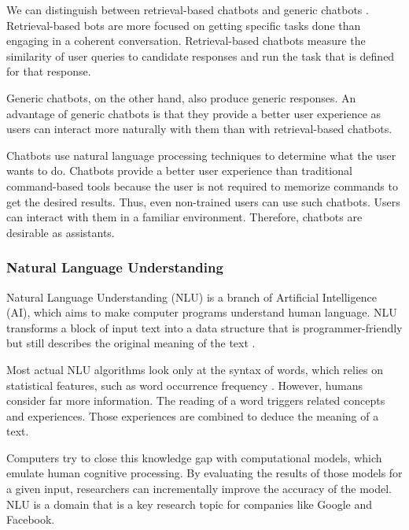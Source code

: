 
We can distinguish between retrieval-based chatbots and generic chatbots \cite{NLKl19,WWX*16}.
Retrieval-based bots are more focused on getting specific tasks done than engaging in a coherent conversation.
Retrieval-based chatbots measure the similarity of user queries to candidate responses and run the task that is defined for that response.

Generic chatbots, on the other hand, also produce generic responses.
An advantage of generic chatbots is that they provide a better user experience as users can interact more naturally with them than with retrieval-based chatbots.

Chatbots use natural language processing techniques to determine what the user wants to do.
Chatbots provide a better user experience \cite{CHW*17} than traditional command-based tools because the user is not required to memorize commands to get the desired results.
Thus, even non-trained users can use such chatbots.
Users can interact with them in a familiar environment. 
Therefore, chatbots are desirable as assistants.

\subsubsection{Natural Language Understanding}\label{sec:NLU}
Natural Language Understanding (NLU) is a branch of Artificial Intelligence (AI), which aims to make computer programs understand human language.
NLU transforms a block of input text into a data structure that is programmer-friendly but still describes the original meaning of the text \cite{CWB*11}.

Most actual NLU algorithms look only at the syntax of words, which relies on statistical features, such as word occurrence frequency \cite{CaWh14}.
However, humans consider far more information. The reading of a word triggers related concepts and experiences. Those experiences are combined to deduce the meaning of a text.

Computers try to close this knowledge gap with computational models, which emulate human cognitive processing.
By evaluating the results of those models for a given input, researchers can incrementally improve the accuracy of the model. \cite{CaWh14}
NLU is a domain that is a key research topic for companies like Google and Facebook. \cite{AAA17}


